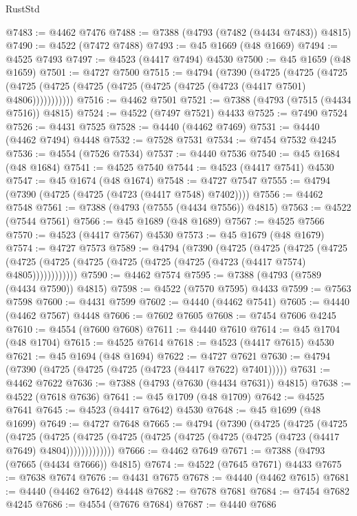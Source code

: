\begin{lexlean}{RustStd}
\begin{coremodule}
@7483 := @4462 @7476
@7488 := @7388 (@4793 (@7482 (@4434 @7483)) @4815)
@7490 := @4522 (@7472 @7488)
@7493 := @45 @1669 (@48 @1669)
@7494 := @4525 @7493
@7497 := @4523 (@4417 @7494) @4530
@7500 := @45 @1659 (@48 @1659)
@7501 := @4727 @7500
@7515 := @4794
    (@7390
      (@4725
        (@4725
          (@4725 (@4725 (@4725 (@4725 (@4725 (@4725 (@4725 (@4723 (@4417 @7501) @4806)))))))))))
@7516 := @4462 @7501
@7521 := @7388 (@4793 (@7515 (@4434 @7516)) @4815)
@7524 := @4522 (@7497 @7521) @4433
@7525 := @7490 @7524
@7526 := @4431 @7525
@7528 := @4440 (@4462 @7469)
@7531 := @4440 (@4462 @7494) @4448
@7532 := @7528 @7531
@7534 := @7454 @7532 @4245
@7536 := @4554 (@7526 @7534)
@7537 := @4440 @7536
@7540 := @45 @1684 (@48 @1684)
@7541 := @4525 @7540
@7544 := @4523 (@4417 @7541) @4530
@7547 := @45 @1674 (@48 @1674)
@7548 := @4727 @7547
@7555 := @4794 (@7390 (@4725 (@4725 (@4723 (@4417 @7548) @7402))))
@7556 := @4462 @7548
@7561 := @7388 (@4793 (@7555 (@4434 @7556)) @4815)
@7563 := @4522 (@7544 @7561)
@7566 := @45 @1689 (@48 @1689)
@7567 := @4525 @7566
@7570 := @4523 (@4417 @7567) @4530
@7573 := @45 @1679 (@48 @1679)
@7574 := @4727 @7573
@7589 := @4794
    (@7390
      (@4725
        (@4725
          (@4725
            (@4725 (@4725 (@4725 (@4725 (@4725 (@4725 (@4725 (@4723 (@4417 @7574) @4805))))))))))))
@7590 := @4462 @7574
@7595 := @7388 (@4793 (@7589 (@4434 @7590)) @4815)
@7598 := @4522 (@7570 @7595) @4433
@7599 := @7563 @7598
@7600 := @4431 @7599
@7602 := @4440 (@4462 @7541)
@7605 := @4440 (@4462 @7567) @4448
@7606 := @7602 @7605
@7608 := @7454 @7606 @4245
@7610 := @4554 (@7600 @7608)
@7611 := @4440 @7610
@7614 := @45 @1704 (@48 @1704)
@7615 := @4525 @7614
@7618 := @4523 (@4417 @7615) @4530
@7621 := @45 @1694 (@48 @1694)
@7622 := @4727 @7621
@7630 := @4794 (@7390 (@4725 (@4725 (@4725 (@4723 (@4417 @7622) @7401)))))
@7631 := @4462 @7622
@7636 := @7388 (@4793 (@7630 (@4434 @7631)) @4815)
@7638 := @4522 (@7618 @7636)
@7641 := @45 @1709 (@48 @1709)
@7642 := @4525 @7641
@7645 := @4523 (@4417 @7642) @4530
@7648 := @45 @1699 (@48 @1699)
@7649 := @4727 @7648
@7665 := @4794
    (@7390
      (@4725
        (@4725
          (@4725
            (@4725
              (@4725
                (@4725 (@4725 (@4725 (@4725 (@4725 (@4725 (@4723 (@4417 @7649) @4804)))))))))))))
@7666 := @4462 @7649
@7671 := @7388 (@4793 (@7665 (@4434 @7666)) @4815)
@7674 := @4522 (@7645 @7671) @4433
@7675 := @7638 @7674
@7676 := @4431 @7675
@7678 := @4440 (@4462 @7615)
@7681 := @4440 (@4462 @7642) @4448
@7682 := @7678 @7681
@7684 := @7454 @7682 @4245
@7686 := @4554 (@7676 @7684)
@7687 := @4440 @7686

\end{coremodule}
\end{lexlean}
